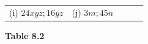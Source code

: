 {\begin{center}
\begin{xtabular*}{\mytablewidth}[t]{|p{10\mystarwidth}|p{10\mystarwidth}|p{10\mystarwidth}|p{10\mystarwidth}|p{10\mystarwidth}|}
        (i) $24xyz;16yz$\hspace{5ex} &
        (j) $3m;45n$%
     \tabularnewline{}
    \end{xtabular*}
      \end{center}
    \begin{center}{\small\bfseries Table 8.2}\end{center}
        }%
    \par
        \label{m39383*uid7}
